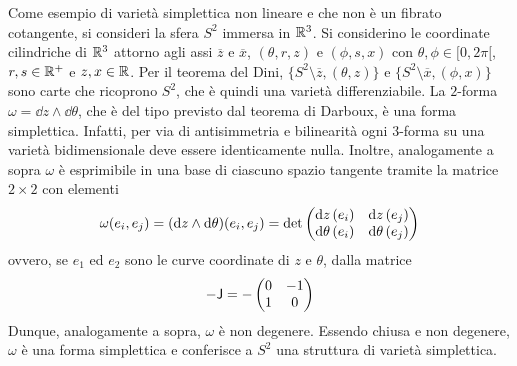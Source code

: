 Come esempio di varietà simplettica non lineare e che non è un fibrato cotangente, si consideri la sfera $S^2$ immersa in $\mathbb{R}^3$. Si considerino le coordinate cilindriche di $\mathbb{R}^3$ attorno agli assi $\overline{z}$ e $\overline{x}$, $(\theta,r,z)$ e $(\phi, s, x)$ con $\theta,\phi \in [0,2\pi[$, $r,s \in \mathbb{R}^+$ e $z,x \in \mathbb{R}$. Per il teorema del Dini, $\big\lbrace S^2 \setminus \overline{z}, (\theta,z)\big\rbrace$ e $\big\lbrace S^2 \setminus \overline{x}, (\phi,x)\big\rbrace$ sono carte che ricoprono $S^2$, che è quindi una varietà differenziabile. La $2$-forma $\omega = \dd{z} \wedge \dd{\theta}$, che è del tipo previsto dal teorema di Darboux, è una forma simplettica. Infatti, per via di antisimmetria e bilinearità ogni $3$-forma su una varietà bidimensionale deve essere identicamente nulla. Inoltre, analogamente a sopra $\omega$ è esprimibile in una base di ciascuno spazio tangente tramite la matrice $2\times 2$ con elementi 
\begin{equation*}
\omega(e_i,e_j) = (\dd{z} \wedge \dd{\theta}) (e_i, e_j) = \det\pmqty{\dd{z}(e_i) & \dd{z}(e_j) \\ \dd{\theta}(e_i) & \dd{\theta}(e_j)}
\end{equation*} 
ovvero, se $e_1$ ed $e_2$ sono le curve coordinate di $z$ e $\theta$, dalla matrice
\begin{equation*}
  - \mathsf{J} = - \pmqty{0 & -1 \\ 1 & 0}
\end{equation*}
Dunque, analogamente a sopra, $\omega$ è non degenere. Essendo chiusa e non degenere, $\omega$ è una forma simplettica e conferisce a $S^2$ una struttura di varietà simplettica.


